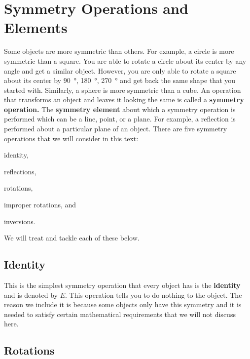 
    \section*{\label{sec:sym_ops}Symmetry Operations and Elements} %

    Some objects are more symmetric than others. For example, a circle is more symmetric than a square. You are able to rotate a circle about its center by any angle and get a similar object. However, you are only able to rotate a square about its center by \SI{90}{\degree}, \SI{180}{\degree}, \SI{270}{\degree} and get back the same shape that you started with. Similarly, a sphere is more symmetric than a cube. An operation that transforms an object and leaves it looking the same is called a \textbf{symmetry operation.} The \textbf{symmetry element} about which a symmetry operation is performed which can be a line, point, or a plane. For example, a reflection is performed about a particular plane of an object. There are five symmetry operations that we will consider in this text:
    \begin{enumerate*}[(1)]
        \item identity, 
        \item reflections, 
        \item rotations, 
        \item improper rotations, and
        \item inversions.
    \end{enumerate*}
    We will treat and tackle each of these below.

        \subsection*{Identity} %
        \label{sub:identity}
        
        This is the simplest symmetry operation that every object has is the \textbf{identity} and is denoted by $E$. This operation tells you to do nothing to the object. The reason we include it is because some objects only have this symmetry and it is needed to satisfy certain mathematical requirements that we will not discuss here.


        \subsection*{Rotations} %
        \label{sub:rotation}

